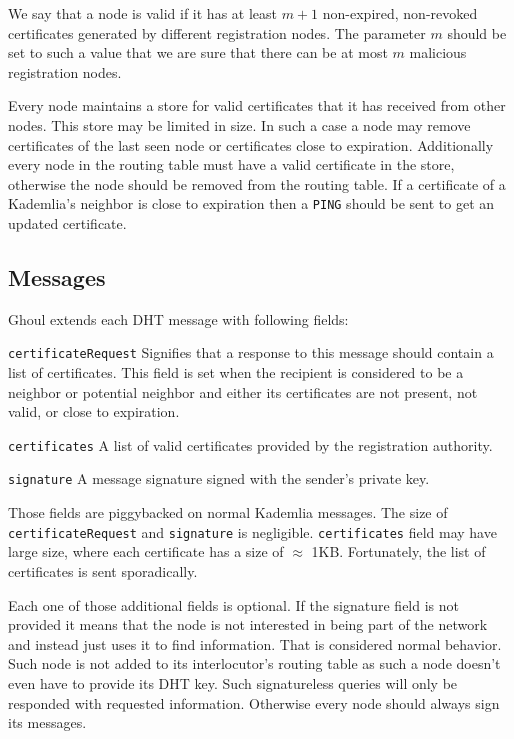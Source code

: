 We say that a node is valid if it has at least $m + 1$ non-expired, non-revoked
certificates generated by different registration nodes. The parameter $m$ should
be set to such a value that we are sure that there can be at most $m$ malicious
registration nodes.

Every node maintains a store for valid certificates that it has received from
other nodes. This store may be limited in size. In such a case a node may remove
certificates of the last seen node or certificates close to expiration.
Additionally every node in the routing table must have a valid certificate in
the store, otherwise the node should be removed from the routing table. If a
certificate of a Kademlia's neighbor is close to expiration then a
\texttt{PING} should be sent to get an updated certificate.

\subsection{Messages}
Ghoul extends each DHT message with following fields:
\begin{description}
  \item{\texttt{certificateRequest}} Signifies that a response to this message
    should contain a list of certificates. This field is set when the recipient
    is considered to be a neighbor or potential neighbor and either its
    certificates are not present, not valid, or close to expiration.
  \item{\texttt{certificates}} A list of valid certificates provided by the
    registration authority.
  \item{\texttt{signature}} A message signature signed with the sender's private
    key.
\end{description}

Those fields are piggybacked on normal Kademlia messages. The size of
\texttt{certificateRequest} and \texttt{signature} is negligible.
\texttt{certificates} field may have large size, where each certificate has a
size of $\approx$ 1KB. Fortunately, the list of certificates is sent
sporadically.

Each one of those additional fields is optional. If the signature field is not
provided it means that the node is not interested in being part of the network
and instead just uses it to find information. That is considered normal
behavior. Such node is not added to its interlocutor's routing table as such a
node doesn't even have to provide its DHT key. Such signatureless queries
will only be responded with requested information.
Otherwise every node should always sign its messages.

